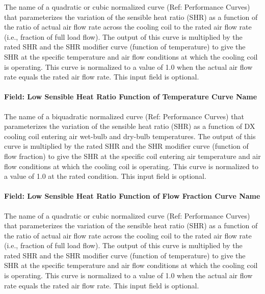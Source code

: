 The name of a quadratic or cubic normalized curve (Ref: Performance Curves) that parameterizes the variation of the sensible heat ratio (SHR) as a function of the ratio of actual air flow rate across the cooling coil to the rated air flow rate (i.e., fraction of full load flow). The output of this curve is multiplied by the rated SHR and the SHR modifier curve (function of temperature) to give the SHR at the specific temperature and air flow conditions at which the cooling coil is operating. This curve is normalized to a value of 1.0 when the actual air flow rate equals the rated air flow rate. This input field is optional.

\paragraph{Field: Low Sensible Heat Ratio Function of Temperature Curve Name}\label{field-low-sensible-heat-ratio-function-of-temperature-curve-name}

The name of a biquadratic normalized curve (Ref: Performance Curves) that parameterizes the variation of the sensible heat ratio (SHR) as a function of DX cooling coil entering air wet-bulb and dry-bulb temperatures. The output of this curve is multiplied by the rated SHR and the SHR modifier curve (function of flow fraction) to give the SHR at the specific coil entering air temperature and air flow conditions at which the cooling coil is operating. This curve is normalized to a value of 1.0 at the rated condition. This input field is optional.

\paragraph{Field: Low Sensible Heat Ratio Function of Flow Fraction Curve Name}\label{field-low-sensible-heat-ratio-function-of-flow-fraction-curve-name}

The name of a quadratic or cubic normalized curve (Ref: Performance Curves) that parameterizes the variation of the sensible heat ratio (SHR) as a function of the ratio of actual air flow rate across the cooling coil to the rated air flow rate (i.e., fraction of full load flow). The output of this curve is multiplied by the rated SHR and the SHR modifier curve (function of temperature) to give the SHR at the specific temperature and air flow conditions at which the cooling coil is operating. This curve is normalized to a value of 1.0 when the actual air flow rate equals the rated air flow rate. This input field is optional.

